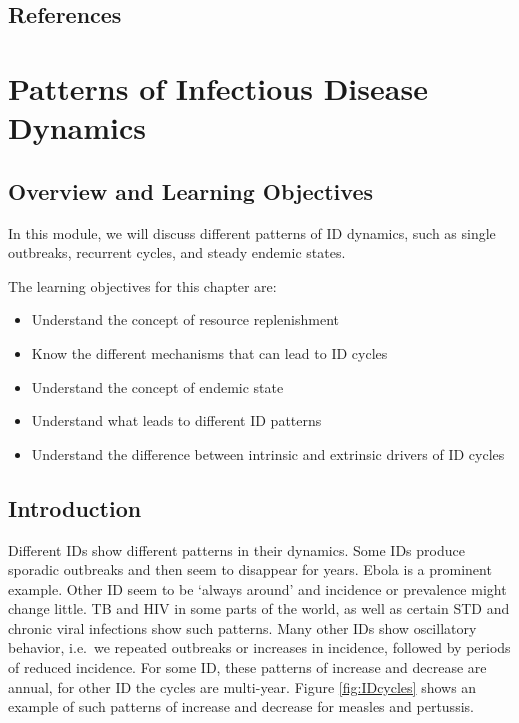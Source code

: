\documentclass[
]{book}
\providecommand{\tightlist}{%
  \setlength{\itemsep}{0pt}\setlength{\parskip}{0pt}}
\begin{document}
\hypertarget{references-2}{%
\section{References}\label{references-2}}

\hypertarget{patterns-of-infectious-disease-dynamics}{%
\chapter{Patterns of Infectious Disease Dynamics}\label{patterns-of-infectious-disease-dynamics}}

\hypertarget{overview-and-learning-objectives-2}{%
\section{Overview and Learning Objectives}\label{overview-and-learning-objectives-2}}

In this module, we will discuss different patterns of ID dynamics, such as single outbreaks, recurrent cycles, and steady endemic states.

The learning objectives for this chapter are:

\begin{itemize}
\tightlist
\item
  Understand the concept of resource replenishment
\item
  Know the different mechanisms that can lead to ID cycles
\item
  Understand the concept of endemic state
\item
  Understand what leads to different ID patterns
\item
  Understand the difference between intrinsic and extrinsic drivers of ID cycles
\end{itemize}

\hypertarget{introduction-2}{%
\section{Introduction}\label{introduction-2}}

Different IDs show different patterns in their dynamics. Some IDs produce sporadic outbreaks and then seem to disappear for years. Ebola is a prominent example. Other ID seem to be `always around' and incidence or prevalence might change little. TB and HIV in some parts of the world, as well as certain STD and chronic viral infections show such patterns. Many other IDs show oscillatory behavior, i.e.~we repeated outbreaks or increases in incidence, followed by periods of reduced incidence. For some ID, these patterns of increase and decrease are annual, for other ID the cycles are multi-year. Figure \ref{fig:IDcycles} shows an example of such patterns of increase and decrease for measles and pertussis.
\end{document}
